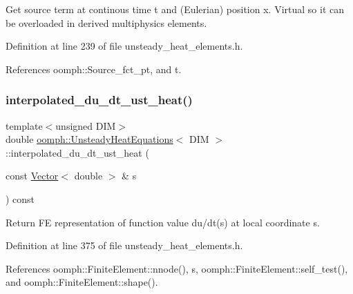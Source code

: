 Get source term at continous time t and (Eulerian) position x. Virtual so it can be overloaded in derived multiphysics elements. 



Definition at line 239 of file unsteady\+\_\+heat\+\_\+elements.\+h.



References oomph\+::\+Source\+\_\+fct\+\_\+pt, and t.

\mbox{\label{classoomph_1_1UnsteadyHeatEquations_ac113fbfb338fa3d20b937035ba8f6fd3}} 
\subsubsection{\texorpdfstring{interpolated\+\_\+du\+\_\+dt\+\_\+ust\+\_\+heat()}{interpolated\_du\_dt\_ust\_heat()}}
{\footnotesize\ttfamily template$<$unsigned D\+IM$>$ \\
double \hyperlink{classoomph_1_1UnsteadyHeatEquations}{oomph\+::\+Unsteady\+Heat\+Equations}$<$ D\+IM $>$\+::interpolated\+\_\+du\+\_\+dt\+\_\+ust\+\_\+heat (\begin{DoxyParamCaption}\item[{const \hyperlink{classoomph_1_1Vector}{Vector}$<$ double $>$ \&}]{s }\end{DoxyParamCaption}) const\hspace{0.3cm}{\ttfamily [inline]}}



Return FE representation of function value du/dt(s) at local coordinate s. 



Definition at line 375 of file unsteady\+\_\+heat\+\_\+elements.\+h.



References oomph\+::\+Finite\+Element\+::nnode(), s, oomph\+::\+Finite\+Element\+::self\+\_\+test(), and oomph\+::\+Finite\+Element\+::shape().

\mbox{\label{classoomph_1_1UnsteadyHeatEquations_a6e9c1454f84d2b55e5c573df195b4946}} 
